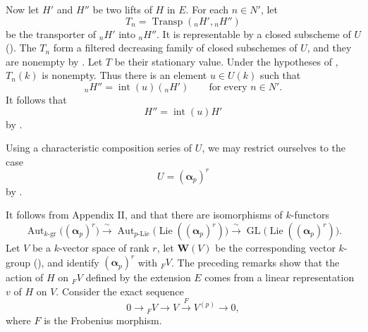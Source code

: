 Now let \(H'\) and \(H''\) be two lifts of \(H\) in \(E\).  For
each \(n\in N'\), let
\[
  T_n=\operatorname{Transp}({}_nH',{}_nH'')
\]
be the transporter of \({}_nH'\) into \({}_nH''\).  It is
representable by a closed subscheme of \(U\)
().  The \(T_n\) form a filtered decreasing
family of closed subschemes of \(U\), and they are nonempty by
.  Let \(T\) be their stationary value.  Under the
hypotheses of , \(T_n(k)\) is nonempty.  Thus there is an
element \(u\in U(k)\) such that
\[
  {}_nH''=\operatorname{int}(u)({}_nH')
  \qquad\text{for every \(n\in N'\)}.
\]
It follows that
\[
  H''=\operatorname{int}(u)H'
\]
by .



Using a characteristic composition series of \(U\), we may
restrict ourselves to the case
\[
  U=(\boldsymbol\alpha_p)^r
\]
by .

It follows from Appendix II,  and  that there are
isomorphisms of \(k\)-functors
\[
  \operatorname{Aut}_{k\text{-}\mathrm{gr}}
    \bigl((\boldsymbol\alpha_p)^r\bigr)
  \xrightarrow{\ \sim\ }
  \operatorname{Aut}_{p\text{-}\mathrm{Lie}}
    \bigl(\operatorname{Lie}((\boldsymbol\alpha_p)^r)\bigr)
  \xrightarrow{\ \sim\ }
  \operatorname{GL}
    \bigl(\operatorname{Lie}((\boldsymbol\alpha_p)^r)\bigr).
\]
Let \(V\) be a \(k\)-vector space of rank \(r\), let
\(\mathbf W(V)\) be the corresponding vector \(k\)-group
(), and identify \((\boldsymbol\alpha_p)^r\) with
\({}_F V\).  The preceding remarks show that the action of \(H\)
on \({}_F V\) defined by the extension \(E\) comes from a linear
representation \(v\) of \(H\) on \(V\).  Consider the exact
sequence
\[
  \tag{*}\label{sga3:xvii:proposition:5-4-1:equation:star}
  0\longrightarrow {}_F V\longrightarrow V
    \xrightarrow{F}V^{(p)}\longrightarrow0,
\]
where \(F\) is the Frobenius morphism.

